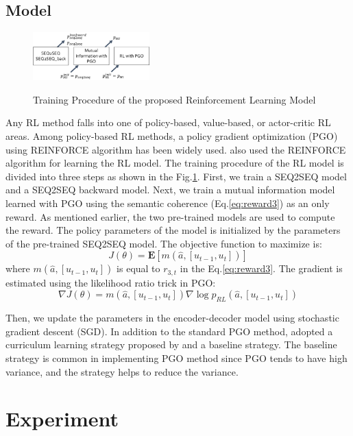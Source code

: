 \documentclass[letterpaper]{article}
\begin{document}
\subsection{Model}
\begin{figure}[b!]
    \centering
    \includegraphics[width=0.4\textwidth]{three_steps.png} 
    \label{fig:three_steps}
    \caption{\small Training Procedure of the proposed Reinforcement Learning Model}
 \end{figure}
Any RL method falls into one of policy-based, value-based, or actor-critic RL areas. Among policy-based RL methods, a policy gradient optimization (PGO) using REINFORCE algorithm \cite{Williams} has been widely used. \cite{Li} also used the REINFORCE algorithm for learning the RL model. The training procedure of the RL model is divided into three steps as shown in the Fig.\ref{fig:three_steps}. First, we train a SEQ2SEQ model and a SEQ2SEQ backward model. Next, we train a mutual information model learned with PGO using the semantic coherence (Eq.\ref{eq:reward3}) as an only reward. As mentioned earlier, the two pre-trained models are used to compute the reward. The policy parameters of the model is initialized by the parameters of the pre-trained SEQ2SEQ model. The objective function to maximize is:
\begin{equation}
	J(\theta)= 	\mathbf{E} [m(\hat{a},[u_{t-1},u_t])]
\end{equation}
where $m(\hat{a},[u_{t-1},u_t])$ is equal to $r_{3,t}$ in the Eq.\ref{eq:reward3}. The gradient is estimated using the likelihood ratio trick in PGO:
\begin{equation}
	\nabla J(\theta) = m(\hat{a},[u_{t-1},u_t]) \nabla \log p_{RL}(\hat{a},[u_{t-1},u_t]) \label{eq:gradient}
\end{equation}

Then, we update the parameters in the encoder-decoder model using stochastic gradient descent (SGD). In addition to the standard PGO method, \cite{Li} adopted a curriculum learning strategy proposed by \cite{Ranzato} and a baseline strategy. The baseline strategy is common in implementing PGO method since PGO tends to have high variance, and the strategy helps to reduce the variance.

\section{Experiment}
\end{document}
